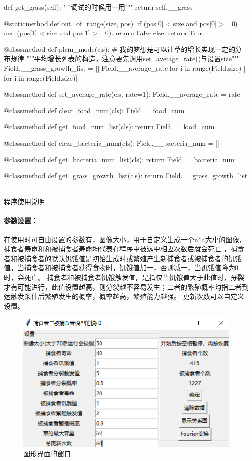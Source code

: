 \documentclass[a4paper]{ctexart}
\makeatletter
\renewcommand{\section}{\@startsection{section}{1}{0mm}
	{-\baselineskip}{0.5\baselineskip}{\bf\leftline}}
\makeatother
\begin{document}
\begin{python}
		def get_grass(self):
			"""调试的时候用一用"""
			return self.__grass
	
		@staticmethod
		def out_of_range(size, pos):
			if (pos[0] < size and pos[0] >= 0) and (pos[1] < size and pos[1] >= 0):
				return False
			else:
				return True
	
		@classmethod
		def plain_mode(cls):  # 我的梦想是可以让草的增长实现一定的分布规律
			"""平均增长列表的构造，注意要先调用set_average_rate()与设置size"""
			Field.__grass_growth_list = [[
				Field.__average_rate for i in range(Field.size)
			] for i in range(Field.size)]
	
		@classmethod
		def set_average_rate(cls, rate=1):
			Field.__average_rate = rate
	
		@classmethod
		def clear_food_num(cls):
			Field.__food_num = []
	
		@classmethod
		def get_food_num_list(cls):
			return Field.__food_num
	
		@classmethod
		def clear_bacteria_num(cls):
			Field.__bacteria_num = []
	
		@classmethod
		def get_bacteria_num_list(cls):
			return Field.__bacteria_num
	
		@classmethod
		def get_grass_growth_list(cls):
			return Field.__grass_growth_list
	\end{python}
	\begin{align*}
		\quad
	\end{align*}
	\section{\Large{程序使用说明}}
		\paragraph{参数设置：}
		在使用时可自由设置的参数有，图像大小，用于自定义生成一个n*n大小的图像，捕食者寿命和和被捕食者寿命均代表在程序中被选中相应次数后就会死亡
		，捕食者和被捕食者的默认饥饿值是初始生成时或繁殖产生新捕食者或被捕食者的饥饿值，当捕食者和被捕食者获得食物时，饥饿值加一，否则减一，当饥饿值降为0时，会死亡。
		捕食者和被捕食者饥饿触发值，是指仅当饥饿值大于此值时，分裂才有可能进行，此值设置越高，则分裂越不容易发生；二者的繁殖概率均指二者到达触发条件后繁殖发生的概率，概率越高，繁殖能力越强。
		更新次数可以自定义设置。
		\begin{figure}[htbp]
			\centering
			\includegraphics[scale=0.40]{mainwindow.png}
			\caption{图形界面的窗口}
		\end{figure}
\end{document}
